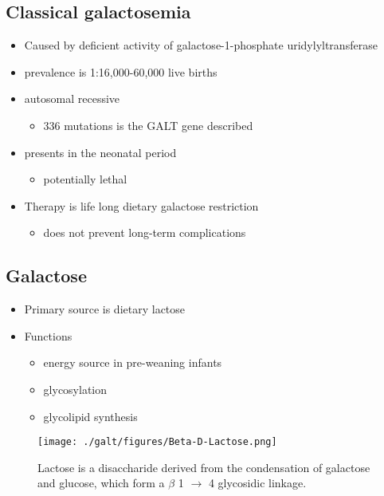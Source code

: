 \documentclass{scrartcl}
\begin{document}
\subsection{Classical galactosemia}
\label{sec:orgd5e57d7}
\begin{itemize}
\item Caused by deficient activity of galactose-1-phosphate uridylyltransferase
\item prevalence is 1:16,000-60,000 live births
\item autosomal recessive
\begin{itemize}
\item 336 mutations is the GALT gene described
\end{itemize}

\item presents in the neonatal period
\begin{itemize}
\item potentially lethal
\end{itemize}

\item Therapy is life long dietary galactose restriction
\begin{itemize}
\item does not prevent long-term complications
\end{itemize}
\end{itemize}

\subsection{Galactose}
\label{sec:org9286448}
\begin{itemize}
\item Primary source is dietary lactose
\item Functions
\begin{itemize}
\item energy source in pre-weaning infants
\item glycosylation
\item glycolipid synthesis
\end{itemize}
\end{itemize}


\begin{figure}[htbp]
\centering
\texttt{[image: ./galt/figures/Beta-D-Lactose.png]}
\caption[lactose]{\label{fig:org41e3f0f}
Lactose is a disaccharide derived from the condensation of galactose and glucose, which form a \(\beta\) 1 \(\to\) 4 glycosidic linkage.}
\end{figure}
\end{document}
